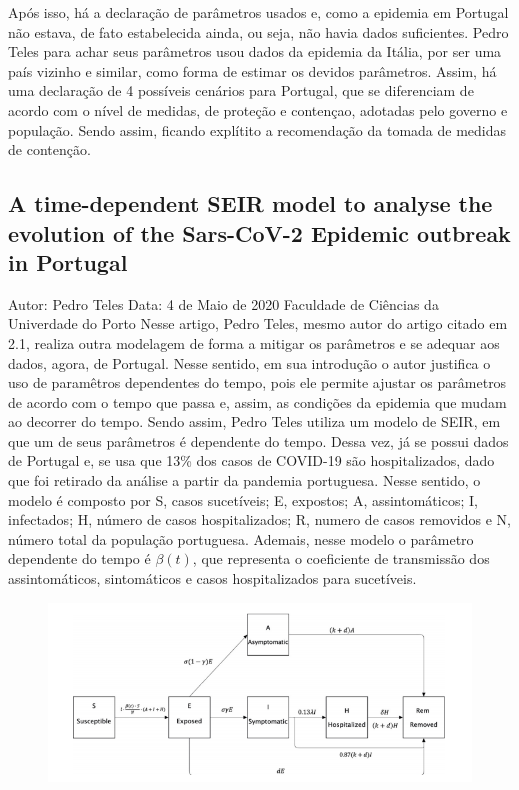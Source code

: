 \documentclass[12pt]{article}
\begin{document}
Após isso, há a declaração de parâmetros usados e, como a epidemia em Portugal não estava, de fato estabelecida ainda, ou seja, não havia dados suficientes. Pedro Teles para achar seus parâmetros usou dados da epidemia da Itália, por ser uma país vizinho e similar, como forma de estimar os devidos parâmetros.
\newline
Assim, há uma declaração de 4 possíveis cenários para Portugal, que se diferenciam de acordo com o nível de medidas, de proteção e contençao, adotadas pelo governo e população. Sendo assim, ficando explítito a recomendação da tomada de medidas de contenção.
\subsection{A time-dependent SEIR model to analyse the evolution of the Sars-CoV-2 Epidemic outbreak in Portugal \cite{ref02}}
Autor: Pedro Teles \newline
Data: 4 de Maio de 2020 \newline
Faculdade de Ciências da Univerdade do Porto
\newline
Nesse artigo, Pedro Teles, mesmo autor do artigo citado em 2.1, realiza outra modelagem de forma a mitigar os parâmetros e se adequar aos dados, agora, de Portugal. Nesse sentido, em sua introdução o autor justifica o uso de paramêtros dependentes do tempo, pois ele permite ajustar os parâmetros de acordo com o tempo que passa e, assim, as condições da epidemia que mudam ao decorrer do tempo.
\newline
\newline
Sendo assim, Pedro Teles utiliza um modelo de SEIR, em que um de seus parâmetros é dependente do tempo. Dessa vez, já se possui dados de Portugal e, se usa que 13\% dos casos de COVID-19 são hospitalizados, dado que foi retirado da análise a partir da pandemia portuguesa.
\newline \newline
Nesse sentido, o modelo é composto por S, casos sucetíveis; E, expostos; A, assintomáticos; I, infectados; H, número de casos hospitalizados; R, numero de casos removidos e N, número total da população portuguesa. Ademais, nesse modelo o parâmetro dependente do tempo é $\beta(t)$, que representa o coeficiente de transmissão dos assintomáticos, sintomáticos e casos hospitalizados para sucetíveis.
\begin{figure}[!h]
    \centering
    \includegraphics[scale=0.65]{trab 02.png}
\end{figure}
\end{document}
